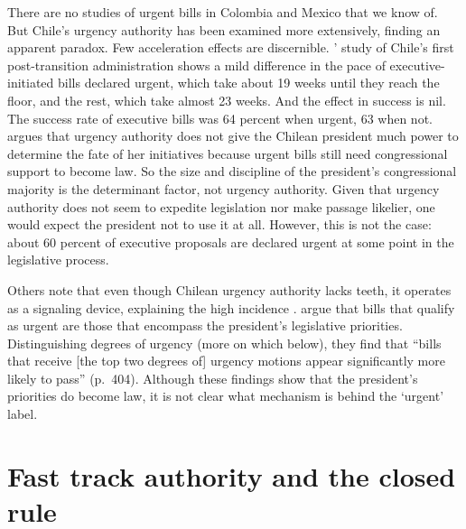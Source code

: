 \documentclass[letter,12pt]{article}
\begin{document}
There are no studies of urgent bills in Colombia and Mexico that we know of. But Chile's urgency authority has been examined more extensively, finding an apparent paradox. Few acceleration effects are discernible. \citeauthor{siavelis.2002}' \citeyearpar{siavelis.2002} study of Chile's first post-transition administration shows a mild difference in the pace of executive-initiated bills declared urgent, which take about 19 weeks until they reach the floor, and the rest, which take almost 23 weeks. And the effect in success is nil. The success rate of executive bills was 64 percent when urgent, 63 when not. \citet[][:51]{nolte.2003} argues that urgency authority does not give the Chilean president much power to determine the fate of her initiatives because urgent bills still need congressional support to become law. So the size and discipline of the president's congressional majority is the determinant factor, not urgency authority. Given that urgency authority does not seem to expedite legislation nor make passage likelier, one would expect the president not to use it at all. However, this is not the case: about 60 percent of executive proposals are declared urgent at some point in the legislative process. 

Others note that even though Chilean urgency authority lacks teeth, it operates as a signaling device, explaining the high incidence \citep{berrios.gamboa.fiscChile.2006,aninat.exagCoop2006}. \citet{aleman.navia.UrgChi.2009} argue that bills that qualify as urgent are those that encompass the president's legislative priorities. Distinguishing degrees of urgency (more on which below), they find that ``bills that receive [the top two degrees of] urgency motions appear significantly more likely to pass'' (p.~404). Although these findings show that the president's priorities do become law, it is not clear what mechanism is behind the `urgent' label.


\section{Fast track authority and the closed rule}

\end{document}
